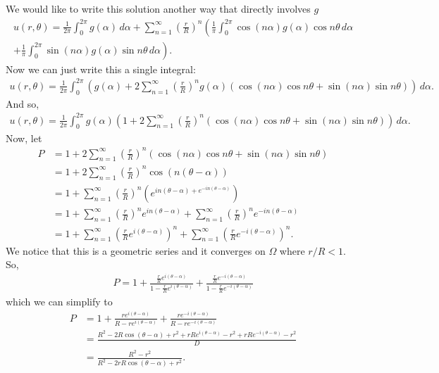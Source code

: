 \documentclass{book}
\theoremstyle{definition}
\newcommand{\f}[2]{\frac{#1}{#2}}
\newcommand{\lp}{\left(}
\newcommand{\rp}{\right)}
\begin{document}
We would like to write this solution another way that directly involves $g$
\begin{align*}
u(r,\theta) = \f{1}{2\pi}\int^{2\pi}_0 g(\alpha)\,d\alpha + \sum^\infty_{n=1}\left(\f{r}{R}\right)^n\left(\f{1}{\pi}\int^{2\pi}_0 \cos(n\alpha)g(\alpha)\cos n\theta\,d\alpha \right.\\\left. + \f{1}{\pi}\int^{2\pi}_0 \sin(n\alpha)g(\alpha)\sin n\theta\,d\alpha \right).
\end{align*}
Now we can just write this a single integral:
\begin{align*}
u(r,\theta) = \f{1}{2\pi}\int^{2\pi}_0 \left( g(\alpha) + 2\sum^\infty_{n=1}\left(\f{r}{R}\right)^n g(\alpha)\left( \cos(n\alpha)\cos n\theta + \sin(n\alpha)\sin n\theta\right)\right)\,d\alpha.
\end{align*}
And so,
\begin{align*}
u(r,\theta) = \f{1}{2\pi}\int^{2\pi}_0 g(\alpha)\left( 1 + 2\sum^\infty_{n=1}\left(\f{r}{R}\right)^n \left( \cos(n\alpha)\cos n\theta + \sin(n\alpha)\sin n\theta\right)\right)\,d\alpha .
\end{align*}
Now, let
\begin{align*}
P &= 1 + 2\sum^\infty_{n=1}\left(\f{r}{R}\right)^n \left( \cos(n\alpha)\cos n\theta + \sin(n\alpha)\sin n\theta\right)\\
&= 1 + 2\sum^\infty_{n=1}\left(\f{r}{R}\right)^n \cos(n(\theta-\alpha))\\
&= 1 + \sum^\infty_{n=1}\left(\f{r}{R}\right)^n \lp e^{in(\theta-\alpha) + e^{-in(\theta-\alpha)}} \rp\\
&= 1 + \sum^\infty_{n=1}\left(\f{r}{R}\right)^n e^{in(\theta-\alpha)} + \sum^\infty_{n=1}\left(\f{r}{R}\right)^n e^{-in(\theta-\alpha)}\\
&= 1 + \sum^\infty_{n=1} \lp \f{r}{R}e^{i(\theta-\alpha)} \rp^n + \sum^\infty_{n=1} \lp \f{r}{R}e^{-i(\theta-\alpha)} \rp^n.
\end{align*}
We notice that this is a geometric series and it converges on $\Omega$ where $r/R < 1$. So,
\begin{align*}
P = 1 + \f{\f{r}{R}e^{i(\theta-\alpha)}}{1 - \f{r}{R}e^{i(\theta-\alpha)}} + \f{\f{r}{R}e^{-i(\theta-\alpha)}}{1-\f{r}{R}e^{-i(\theta-\alpha)}}
\end{align*}
which we can simplify to
\begin{align*}
P 
&= 1 + \f{re^{i(\theta-\alpha)}}{R - re^{i(\theta-\alpha)}} + \f{re^{-i(\theta-\alpha)}}{R-re^{-i(\theta-\alpha)}}\\
&= \f{R^2 - 2R\cos(\theta-\alpha) + r^2 + rRe^{i(\theta-\alpha)} -r^2 + rRe^{-i(\theta-\alpha)} - r^2 }{D}  \\
&= \f{R^2 - r^2}{R^2 - 2rR\cos(\theta-\alpha) + r^2}.
\end{align*}
\end{document}
